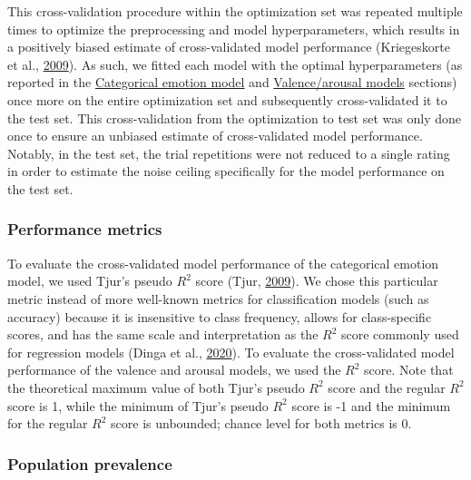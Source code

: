 \documentclass[12pt,american,a4paper,oneside,]{memoir} %
\begin{document}
This cross-validation procedure within the optimization set was repeated multiple times to optimize the preprocessing and model hyperparameters, which results in a positively biased estimate of cross-validated model performance (Kriegeskorte et al., \protect\hyperlink{ref-kriegeskorte2009circular}{2009}). As such, we fitted each model with the optimal hyperparameters (as reported in the \protect\hyperlink{svsd-cat-emo}{Categorical emotion model} and \protect\hyperlink{svsd-valaro}{Valence/arousal models} sections) once more on the entire optimization set and subsequently cross-validated it to the test set. This cross-validation from the optimization to test set was only done once to ensure an unbiased estimate of cross-validated model performance. Notably, in the test set, the trial repetitions were not reduced to a single rating in order to estimate the noise ceiling specifically for the model performance on the test set.

\hypertarget{svsd-perf}{%
\subsubsection{Performance metrics}\label{svsd-perf}}

To evaluate the cross-validated model performance of the categorical emotion model, we used Tjur's pseudo \(R^{2}\) score (Tjur, \protect\hyperlink{ref-Tjur2009-dp}{2009}). We chose this particular metric instead of more well-known metrics for classification models (such as accuracy) because it is insensitive to class frequency, allows for class-specific scores, and has the same scale and interpretation as the \(R^{2}\) score commonly used for regression models (Dinga et al., \protect\hyperlink{ref-Dinga2020-si}{2020}). To evaluate the cross-validated model performance of the valence and arousal models, we used the \(R^{2}\) score. Note that the theoretical maximum value of both Tjur's pseudo \(R^{2}\) score and the regular \(R^{2}\) score is 1, while the minimum of Tjur's pseudo \(R^{2}\) score is -1 and the minimum for the regular \(R^{2}\) score is unbounded; chance level for both metrics is 0.

\hypertarget{population-prevalence}{%
\subsubsection{Population prevalence}\label{population-prevalence}}
\end{document}
